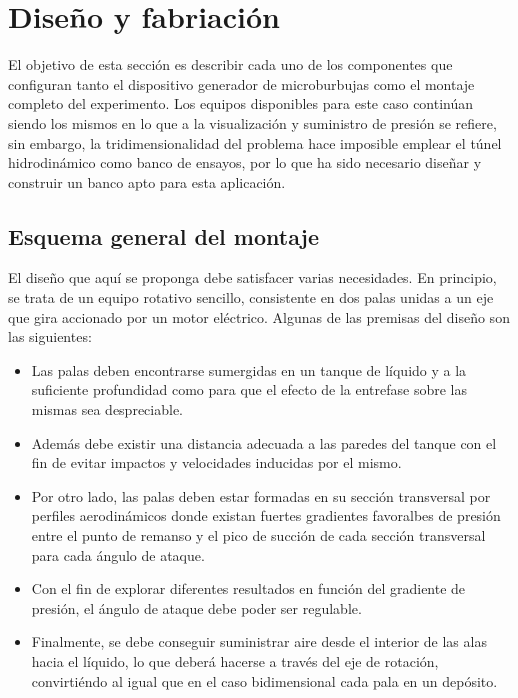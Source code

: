 \section{Diseño y fabriación}

El objetivo de esta sección es describir cada uno de los componentes que configuran tanto el dispositivo generador de microburbujas como el montaje completo del experimento. Los equipos disponibles para este caso continúan siendo los mismos en lo que a la visualización y suministro de presión se refiere, sin embargo, la tridimensionalidad del problema hace imposible emplear el túnel hidrodinámico como banco de ensayos, por lo que ha sido necesario diseñar y construir un banco apto para esta aplicación. 

\subsection{Esquema general del montaje}

El diseño que aquí se proponga debe satisfacer varias necesidades. En principio, se trata de un equipo rotativo sencillo, consistente en dos palas unidas a un eje que gira accionado por un motor eléctrico. Algunas de las premisas del diseño son las siguientes:
\begin{itemize}
\item Las palas deben encontrarse sumergidas en un tanque de líquido y a la suficiente profundidad como para que el efecto de la entrefase sobre las mismas sea despreciable.
\item   Además debe existir una distancia adecuada a las paredes del tanque con el fin de evitar impactos y velocidades inducidas por el mismo.
\item Por otro lado, las palas deben estar formadas en su sección transversal por perfiles aerodinámicos donde existan fuertes gradientes favoralbes de presión entre el punto de remanso y el pico de succión de cada sección transversal para cada ángulo de ataque.
\item Con el fin de explorar diferentes resultados en función del gradiente de presión, el ángulo de ataque debe poder ser regulable. 
\item Finalmente, se debe conseguir suministrar aire desde el interior de las alas hacia el líquido, lo que deberá hacerse a través del eje de rotación, convirtiéndo al igual que en el caso bidimensional cada pala en un depósito. 
\end{itemize} 

